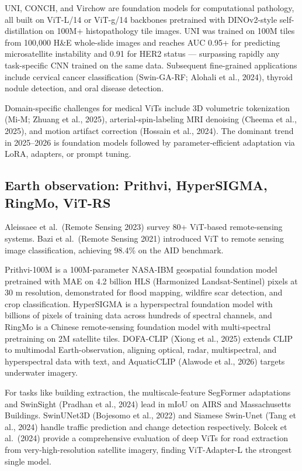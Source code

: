 \documentclass{article}
\begin{document}
UNI, CONCH, and Virchow \citep{vorontsov2024afoundationmodelfo} are foundation models for computational pathology, all built on ViT-L/14 or ViT-g/14 backbones pretrained with DINOv2-style self-distillation on 100M+ histopathology tile images. UNI was trained on 100M tiles from 100,000 H\&E whole-slide images and reaches AUC 0.95+ for predicting microsatellite instability and 0.91 for HER2 status --- surpassing rapidly any task-specific CNN trained on the same data. Subsequent fine-grained applications include cervical cancer classification (Swin-GA-RF; Alohali et al., 2024), thyroid nodule detection, and oral disease detection.

Domain-specific challenges for medical ViTs include 3D volumetric tokenization (Mi-M; Zhuang et al., 2025), arterial-spin-labeling MRI denoising (Cheema et al., 2025), and motion artifact correction (Hossain et al., 2024). The dominant trend in 2025--2026 is foundation models followed by parameter-efficient adaptation via LoRA, adapters, or prompt tuning.

\subsection{Earth observation: Prithvi, HyperSIGMA, RingMo, ViT-RS}\label{earth-observation-prithvi-hypersigma-ringmo-vit-rs}

Aleissaee et al.~(Remote Sensing 2023) survey 80+ ViT-based remote-sensing systems. Bazi et al.~(Remote Sensing 2021) introduced ViT to remote sensing image classification, achieving 98.4\% on the AID benchmark.

Prithvi-100M is a 100M-parameter NASA-IBM geospatial foundation model pretrained with MAE on 4.2 billion HLS (Harmonized Landsat-Sentinel) pixels at 30 m resolution, demonstrated for flood mapping, wildfire scar detection, and crop classification. HyperSIGMA \citep{wang2025visiontransformers} is a hyperspectral foundation model with billions of pixels of training data across hundreds of spectral channels, and RingMo is a Chinese remote-sensing foundation model with multi-spectral pretraining on 2M satellite tiles. DOFA-CLIP (Xiong et al., 2025) extends CLIP to multimodal Earth-observation, aligning optical, radar, multispectral, and hyperspectral data with text, and AquaticCLIP (Alawode et al., 2026) targets underwater imagery.

For tasks like building extraction, the multiscale-feature SegFormer adaptations \citep{chen2022mobileformerbridgi} and SwinSight (Pradhan et al., 2024) lead in mIoU on AIRS and Massachusetts Buildings. SwinUNet3D (Bojesomo et al., 2022) and Siamese Swin-Unet (Tang et al., 2024) handle traffic prediction and change detection respectively. Bolcek et al.~(2024) provide a comprehensive evaluation of deep ViTs for road extraction from very-high-resolution satellite imagery, finding ViT-Adapter-L the strongest single model.
\end{document}

